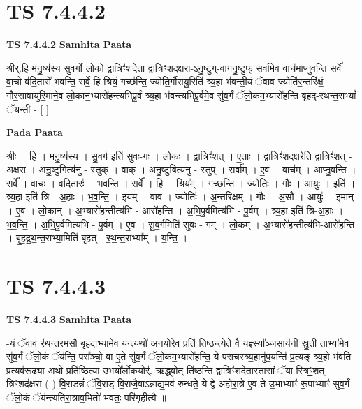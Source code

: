 \documentclass[17pt]{extarticle}
\begin{document}
\section*{ TS 7.4.4.2 }

\textbf{TS 7.4.4.2 } \newline
\textbf{Samhita Paata} \newline

श्रीर्.हि म॑नु॒ष्य॑स्य सुव॒र्गो लो॒को द्वात्रिꣳ॑शदे॒ता द्वात्रिꣳ॑शदक्षरा-ऽनु॒ष्टुग्-वाग॑नु॒ष्टुफ् सर्वा॑मे॒व वाच॑माप्नुवन्ति॒ सर्वे॑ वा॒चो व॑दि॒तारो॑ भवन्ति॒ सर्वे॒ हि श्रियं॒ गच्छ॑न्ति॒ ज्योति॒र्गौरायु॒रिति॑ त्र्य॒हा भ॑वन्ती॒यं ॅवाव ज्योति॑र॒न्तरि॑क्षं॒ गौर॒सावायु॑रि॒माने॒व लो॒कान॒भ्यारो॑हन्त्यभिपू॒र्वं त्र्य॒हा भ॑वन्त्यभिपू॒र्वमे॒व सु॑व॒र्गं ॅलो॒कम॒भ्यारो॑हन्ति बृहद्-रथन्त॒राभ्यां᳚ ॅयन्ती॒ - [  ] \newline

\textbf{Pada Paata} \newline

श्रीः । हि । म॒नु॒ष्य॑स्य । सु॒व॒र्ग इति॑ सुवः-गः । लो॒कः । द्वात्रिꣳ॑शत् । ए॒ताः । द्वात्रिꣳ॑शदक्ष॒रेति॒ द्वात्रिꣳ॑शत् - अ॒क्ष॒रा॒ । अ॒नु॒ष्टुगित्य॑नु - स्तुक् । वाक् । अ॒नु॒ष्टुबित्य॑नु - स्तुप् । सर्वा᳚म् । ए॒व । वाच᳚म् । आ॒प्नु॒व॒न्ति॒ । सर्वे᳚ । वा॒चः । व॒दि॒तारः॑ । भ॒व॒न्ति॒ । सर्वे᳚ । हि । श्रिय᳚म् । गच्छ॑न्ति । ज्योतिः॑ । गौः । आयुः॑ । इति॑ । त्र्य॒हा इति॑ त्रि - अ॒हाः । भ॒व॒न्ति॒ । इ॒यम् । वाव । ज्योतिः॑ । अ॒न्तरि॑क्षम् । गौः । अ॒सौ । आयुः॑ । इ॒मान् । ए॒व । लो॒कान् । अ॒भ्यारो॑ह॒न्तीत्य॑भि - आरो॑हन्ति । अ॒भि॒पू॒र्वमित्य॑भि - पू॒र्वम् । त्र्य॒हा इति॑ त्रि-अ॒हाः । भ॒व॒न्ति॒ । अ॒भि॒पू॒र्वमित्य॑भि - पू॒र्वम् । ए॒व । सु॒व॒र्गमिति॑ सुवः - गम् । लो॒कम् । अ॒भ्यारो॑ह॒न्तीत्य॑भि-आरो॑हन्ति । बृ॒ह॒द्र॒थ॒न्त॒राभ्या॒मिति॑ बृहत् - र॒थ॒न्त॒राभ्या᳚म् । य॒न्ति॒ ।  \newline




\section*{ TS 7.4.4.3 }

\textbf{TS 7.4.4.3 } \newline
\textbf{Samhita Paata} \newline

-यं ॅवाव र॑थन्त॒रम॒सौ बृ॒हदा॒भ्यामे॒व य॒न्त्यथो॑ अ॒नयो॑रे॒व प्रति॑ तिष्ठन्त्ये॒ते वै य॒ज्ञ्स्या᳚ञ्ज॒साय॑नी स्रु॒ती ताभ्या॑मे॒व सु॑व॒र्गं ॅलो॒कं ॅय॑न्ति॒ परा᳚ञ्चो॒ वा ए॒ते सु॑व॒र्गं ॅलो॒कम॒भ्यारो॑हन्ति॒ ये परा॑चस्त्र्य॒हानु॑प॒यन्ति॑ प्र॒त्यङ् त्र्य॒हो भ॑वति प्र॒त्यव॑रूढ्या॒ अथो॒ प्रति॑ष्ठित्या उ॒भयो᳚र्लो॒कयोर्॑. ऋ॒द्ध्वोत् ति॑ष्ठन्ति॒ द्वात्रिꣳ॑शदे॒तास्तासां॒ ॅया स्त्रिꣳ॒॒शत् त्रिꣳ॒॒शद॑क्षरा ( ) वि॒राडन्नं॑ ॅवि॒राड् वि॒राजै॒वाऽन्नाद्य॒मव॑ रुन्धते॒ ये द्वे अ॑होरा॒त्रे ए॒व ते उ॒भाभ्याꣳ॑ रू॒पाभ्याꣳ॑ सुव॒र्गं ॅलो॒कं ॅय॑न्त्यतिरा॒त्राव॒भितो॑ भवतः॒ परि॑गृहीत्यै ॥ \newline
\end{document}
